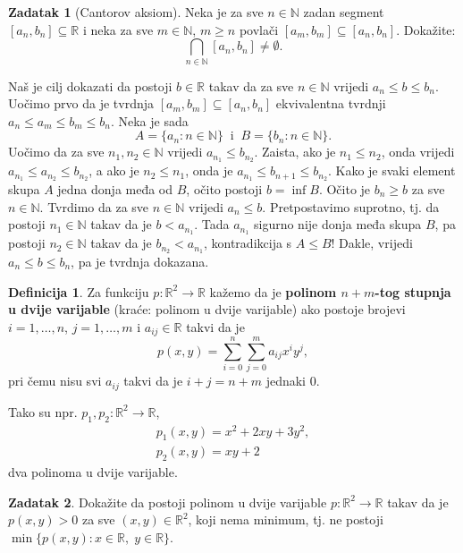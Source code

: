 \documentclass{book}
\renewenvironment{proof}{%
    \vspace{-\parskip}\begin{oldproof}%
    }{%
    \end{oldproof}%
}
\theoremstyle{definition}
\theoremstyle{definition}
\newtheorem{definition}{Definicija}
\newtheorem{exercise}{Zadatak}
\theoremstyle{remark}
\begin{document}
\begin{exercise}[Cantorov aksiom]
\label{Cantor}
Neka je za sve $n\in \mathbb{N}$ zadan segment $[a_n, b_n]\subseteq \mathbb{R}$ i neka za sve $m\in \mathbb{N}$, $m\geq n$ povlači $[a_m, b_m]\subseteq [a_n, b_n]$. Dokažite:
$$\bigcap_{n\in \mathbb{N}}{[a_n, b_n]}\neq \emptyset.$$
\end{exercise}
\begin{proof}[Rješenje]
Naš je cilj dokazati da postoji $b\in \mathbb{R}$ takav da za sve $n\in \mathbb{N}$ vrijedi $a_n\leq b\leq b_n$. Uočimo prvo da je tvrdnja $[a_m, b_m]\subseteq [a_n, b_n]$ ekvivalentna tvrdnji $a_n\leq a_m\leq b_m\leq b_n$. Neka je sada $$A=\{a_n : n\in \mathbb{N}\}\;\;\text{i}\;\;B=\{b_n : n\in \mathbb{N}\}.$$ Uočimo da za sve $n_1, n_2\in \mathbb{N}$ vrijedi $a_{n_1}\leq b_{n_2}$. Zaista, ako je $n_1\leq n_2$, onda vrijedi $a_{n_1}\leq a_{n_2}\leq b_{n_2}$, a ako je $n_2\leq n_1$, onda je $a_{n_1}\leq b_{n+1}\leq b_{n_2}$. Kako je svaki element skupa $A$ jedna donja međa od $B$, očito postoji $b=\inf{B}$. Očito je $b_n\geq b$ za sve $n\in \mathbb{N}$. Tvrdimo da za sve $n\in \mathbb{N}$ vrijedi $a_n\leq b$. Pretpostavimo suprotno, tj. da postoji $n_1\in \mathbb{N}$ takav da je $b<a_{n_1}$. Tada $a_{n_1}$ sigurno nije donja međa skupa $B$, pa postoji $n_2\in \mathbb{N}$ takav da je $b_{n_2}<a_{n_1}$, kontradikcija s $A\leq B$! Dakle, vrijedi $a_n\leq b\leq b_n$, pa je tvrdnja dokazana.
\end{proof}
\begin{definition}
Za funkciju $p : \mathbb{R}^2\to \mathbb{R}$ kažemo da je \textbf{polinom $n+m$-tog stupnja u dvije varijable} (kraće: polinom u dvije varijable) ako postoje brojevi $i=1, \dots, n$, $j=1,\dots, m$ i $a_{ij}\in \mathbb{R}$ takvi da je
$$p(x, y)=\sum_{i=0}^n{\sum_{j=0}^m{{a_{ij}}x^{i}y^j}},$$
pri čemu nisu svi $a_{ij}$ takvi da je $i+j=n+m$ jednaki $0$.
\end{definition}
Tako su npr. $p_1, p_2 : \mathbb{R}^2\to \mathbb{R}$,
\begin{gather*}
p_1(x, y)=x^2+2xy+3y^2,\\
p_2(x, y)=xy+2
\end{gather*}
dva polinoma u dvije varijable.
\begin{exercise}
Dokažite da postoji polinom u dvije varijable $p : \mathbb{R}^2\to \mathbb{R}$ takav da je $p(x, y)>0$ za sve $(x, y)\in \mathbb{R}^2$, koji nema minimum, tj. ne postoji $\min\{p(x, y) : x\in \mathbb{R},\; y\in \mathbb{R}\}.$
\end{exercise}
\end{document}
